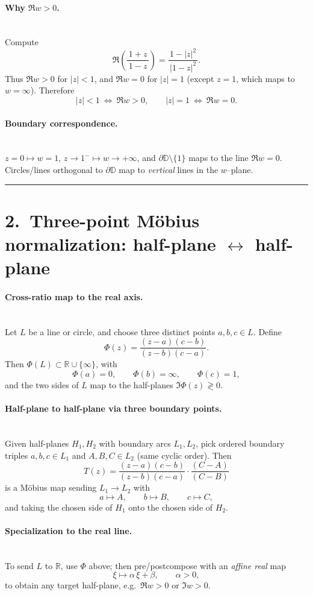 \documentclass[11pt]{article}
\begin{document}
\medskip

\paragraph{Why $\Re w>0$.}\mbox{}\\[2pt]
Compute
\[
\Re\!\left(\frac{1+z}{\,1-z\,}\right)
=\frac{\,1-|z|^{2}\,}{\,|1-z|^{2}\,}.
\]
Thus $\Re w>0$ for $|z|<1$, and $\Re w=0$ for $|z|=1$ (except $z=1$, which maps to $w=\infty$).
Therefore
\[
|z|<1\ \Longleftrightarrow\ \Re w>0,
\qquad
|z|=1\ \Longleftrightarrow\ \Re w=0 .
\]

\medskip

\paragraph{Boundary correspondence.}\mbox{}\\[2pt]
$z=0\mapsto w=1$,
\quad
$z\to1^{-}\mapsto w\to+\infty$,
\quad
and $\partial\mathbb D\setminus\{1\}$ maps to the line $\Re w=0$.\\[2pt]
Circles/lines orthogonal to $\partial\mathbb D$ map to \emph{vertical} lines in the $w$–plane.

\bigskip\hrule\bigskip

\section*{2.\ Three-point Möbius normalization: half-plane $\leftrightarrow$ half-plane}

\paragraph{Cross-ratio map to the real axis.}\mbox{}\\[2pt]
Let $L$ be a line or circle, and choose three distinct points $a,b,c\in L$. Define
\[
\Phi(z)=\frac{(z-a)(c-b)}{(z-b)(c-a)}.
\]
Then $\Phi(L)\subset\mathbb R\cup\{\infty\}$, with
\[
\Phi(a)=0,\qquad \Phi(b)=\infty,\qquad \Phi(c)=1,
\]
and the two sides of $L$ map to the half-planes $\Im\Phi(z)\gtrless 0$.

\medskip

\paragraph{Half-plane to half-plane via three boundary points.}\mbox{}\\[2pt]
Given half-planes $H_1,H_2$ with boundary arcs $L_1,L_2$,
pick ordered boundary triples $a,b,c\in L_1$ and $A,B,C\in L_2$ (same cyclic order).
Then
\[
T(z)=\frac{(z-a)(c-b)}{(z-b)(c-a)}\cdot\frac{(C-A)}{(C-B)}
\]
is a Möbius map sending $L_1\!\to L_2$ with
\[
a\mapsto A,\qquad b\mapsto B,\qquad c\mapsto C,
\]
and taking the chosen side of $H_1$ onto the chosen side of $H_2$.

\medskip

\paragraph{Specialization to the real line.}\mbox{}\\[2pt]
To send $L$ to $\mathbb R$, use $\Phi$ above; then pre/postcompose with an \emph{affine real} map
\[
\xi\longmapsto \alpha\,\xi+\beta,\qquad \alpha>0,
\]
to obtain any target half-plane, e.g.\ $\Re w>0$ or $\Im w>0$.

	
	
\end{document}
